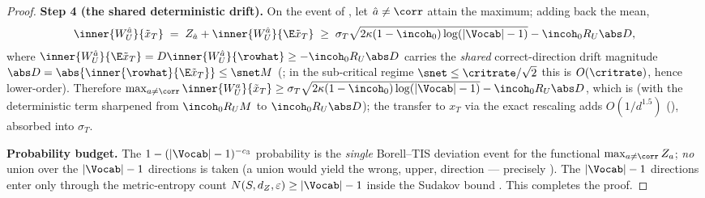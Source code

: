 \begin{proof}
\smallskip\noindent\textbf{Step 4 (the shared deterministic drift).} On the
event of , let $\hat a\neq\corr$ attain the maximum;
adding back the mean,
\begin{align*}
   \inner{W_U^{\hat a}}{\tilde x_T}
   \;=\; Z_{\hat a}+\inner{W_U^{\hat a}}{\E\tilde x_T}
   \;\ge\; \sigma_T\sqrt{2\kappa(1-\incoh_0)\log(|\Vocab|-1)} - \incoh_0 R_U\abs D,
\end{align*}
where $\inner{W_U^{\hat a}}{\E\tilde x_T}=D\inner{W_U^{\hat a}}{\rowhat}\ge-\incoh_0 R_U\abs D$
carries the \emph{shared} correct-direction drift magnitude
$\abs D=\abs{\inner{\rowhat}{\E\tilde x_T}}\le\snet M$ (;
in the sub-critical regime $\snet\le\critrate/\sqrt2$ this is
$O(\critrate)$, hence lower-order). Therefore
$\max_{a\neq\corr}\inner{W_U^a}{\tilde x_T}\ge\sigma_T\sqrt{2\kappa(1-\incoh_0)\log(|\Vocab|-1)}-\incoh_0 R_U\abs D$,
which is  (with the deterministic term
sharpened from $\incoh_0 R_U M$ to $\incoh_0 R_U\abs D$); the transfer to
$x_T$ via the exact rescaling  adds
$O(1/d^{1.5})$ (), absorbed into $\sigma_T$.

\smallskip\noindent\textbf{Probability budget.} The
$1-(|\Vocab|-1)^{-c_3}$ probability is the \emph{single} Borell--TIS
deviation event  for the functional
$\max_{a\neq\corr}Z_a$; \emph{no} union over the $|\Vocab|-1$ directions is
taken (a union would yield the wrong, upper, direction --- precisely
). The $|\Vocab|-1$ directions enter only through
the metric-entropy count $N(S,d_Z,\varepsilon)\ge|\Vocab|-1$ inside the
Sudakov bound . This completes the proof.
\end{proof}

